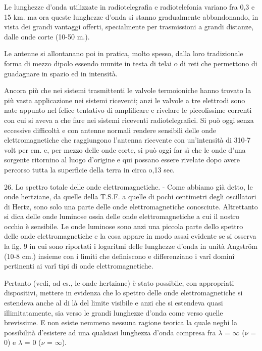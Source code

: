 \documentclass[a4paper]{article}
\begin{document}
Le lunghezze d'onda utilizzate in radiotelegrafia e radiotelefonia variano fra 0,3 e 15 km. ma ora queste lunghezze d'onda si stanno gradualmente abbandonando, in vista dei grandi vantaggi offerti, specialmente per trasmissioni a grandi distanze, dalle onde corte (10-50 m.).

Le antenne si allontanano poi in pratica, molto spesso, dalla loro tradizionale forma di mezzo dipolo essendo munite in testa di telai o di reti che permettono di guadagnare in spazio ed in intensità.

Ancora più che nei sistemi trasmittenti le valvole termoioniche hanno trovato la più vasta applicazione nei sistemi riceventi; anzi le valvole a tre elettrodi sono nate appunto nel felice tentativo di amplificare e rivelare le piccolissime correnti con cui si aveva a che fare nei sistemi riceventi radiotelegrafici. Si può oggi senza eccessive difficoltà e con antenne normali rendere sensibili delle onde elettromagnetiche che raggiungono l'antenna ricevente con un'intensità di 310-7 volt per cm. e, per mezzo delle onde corte, si può oggi far sì che le onde d'una sorgente ritornino al luogo d'origine e qui possano essere rivelate dopo avere percorso tutta la superficie della terra in circa o,13 sec.

26. Lo spettro totale delle onde elettromagnetiche. - Come abbiamo già detto, le onde hertziane, da quelle della T.S.F. a quelle di pochi centimetri degli oscillatori di Hertz, sono solo una parte delle onde elettromagnetiche conosciute. Altrettanto si dica delle onde luminose ossia delle onde elettromagnetiche a cui il nostro occhio è sensibile. Le onde luminose sono anzi una piccola parte dello spettro delle onde elettromagnetiche e la cosa appare in modo assai evidente se si osserva la fig. 9 in cui sono riportati i logaritmi delle lunghezze d'onda in unità Angström (10-8 cm.) insieme con i limiti che definiscono e differenziano i varî dominî pertinenti ai varî tipi di onde elettromagnetiche.

Pertanto (vedi, ad es., le onde hertziane) è stato possibile, con appropriati dispositivi, mettere in evidenza che lo spettro delle onde elettromagnetiche si estendeva anche al di là del limite visibile e anzi che si estendeva quasi illimitatamente, sia verso le grandi lunghezze d'onda come verso quelle brevissime. E non esiste nemmeno nessuna ragione teorica la quale neghi la possibilità d'esistere ad una qualsiasi lunghezza d'onda compresa fra $\lambda$ = $\infty$ ($\nu$ = 0) e $\lambda$ = 0 ($\nu$ = $\infty$).
\end{document}
